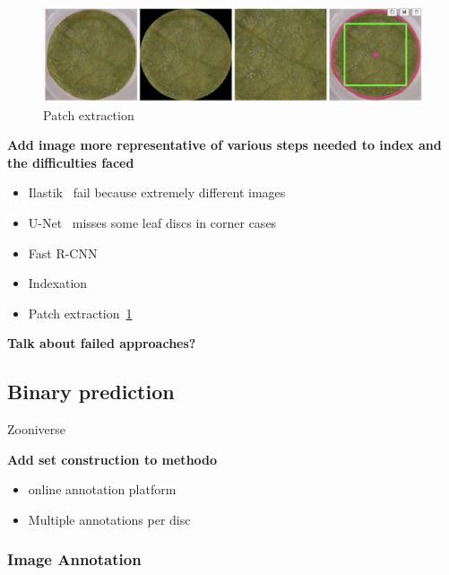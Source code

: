\documentclass[english]{article}
\begin{document}
\begin{figure}
	\centering
	\includegraphics[width=0.8\linewidth]{ld_detector_brute_force.png}
	\caption{Patch extraction}\label{fig:patchextraction}
\end{figure}

\textbf{Add image more representative of various steps needed to index and the difficulties faced}

\begin{itemize}
	\item Ilastik~\parencite{bergIlastikInteractiveMachine2019} fail because extremely different images
	\item U-Net~\parencite{ronnebergerUNetConvolutionalNetworks2015} misses some leaf discs in corner cases
	\item Fast R-CNN~\parencite{girshickFastRCNN2015}
	\item Indexation
	\item Patch extraction~\ref{fig:patchextraction}
\end{itemize}

\textbf{Talk about failed approaches?}

\subsection{Binary prediction}
Zooniverse \parencite{zooniverse}

\textbf{Add set construction to methodo}

\begin{itemize}
	\item online annotation platform
	\item Multiple annotations per disc
\end{itemize}

\subsubsection{Image Annotation}
\end{document}
